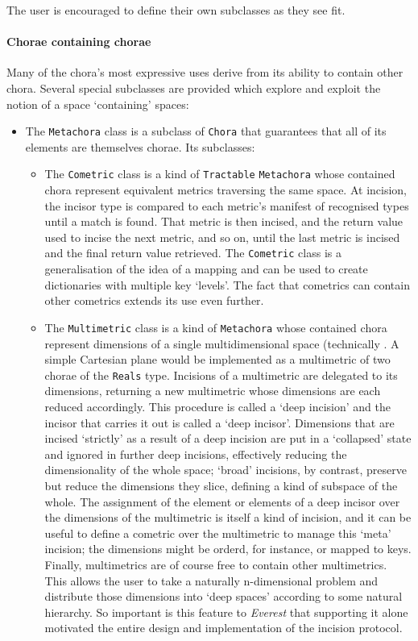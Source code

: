 \documentclass[a4paper,11pt,oneside]{book}
\begin{document}
The user is encouraged to define their own subclasses as they see fit.

\paragraph{Chorae containing chorae}

Many of the chora's most expressive uses derive from its ability to contain other chora. Several special subclasses are provided which explore and exploit the notion of a space `containing' spaces:

\begin{itemize}
\item The \texttt{Metachora} class is a subclass of \texttt{Chora} that guarantees that all of its elements are themselves chorae. Its subclasses:\begin{itemize}
\item The \texttt{Cometric} class is a kind of \texttt{Tractable} \texttt{Metachora} whose contained chora represent equivalent metrics traversing the same space. At incision, the incisor type is compared to each metric's manifest of recognised types until a match is found. That metric is then incised, and the return value used to incise the next metric, and so on, until the last metric is incised and the final return value retrieved. The \texttt{Cometric} class is a generalisation of the idea of a mapping and can be used to create dictionaries with multiple key `levels'. The fact that cometrics can contain other cometrics extends its use even further.
\item The \texttt{Multimetric} class is a kind of \texttt{Metachora} whose contained chora represent dimensions of a single multidimensional space (technically . A simple Cartesian plane would be implemented as a multimetric of two chorae of the \texttt{Reals} type. Incisions of a multimetric are delegated to its dimensions, returning a new multimetric whose dimensions are each reduced accordingly. This procedure is called a `deep incision' and the incisor that carries it out is called a `deep incisor'. Dimensions that are incised `strictly' as a result of a deep incision are put in a `collapsed' state and ignored in further deep incisions, effectively reducing the dimensionality of the whole space; `broad' incisions, by contrast, preserve but reduce the dimensions they slice, defining a kind of subspace of the whole. The assignment of the element or elements of a deep incisor over the dimensions of the multimetric is itself a kind of incision, and it can be useful to define a cometric over the multimetric to manage this `meta' incision; the dimensions might be orderd, for instance, or mapped to keys. Finally, multimetrics are of course free to contain other multimetrics. This allows the user to take a naturally n-dimensional problem and distribute those dimensions into `deep spaces' according to some natural hierarchy. So important is this feature to \textit{Everest} that supporting it alone motivated the entire design and implementation of the incision protocol.
\end{itemize}
\end{itemize}
\end{document}
